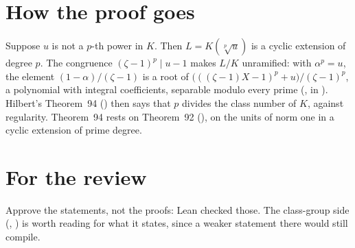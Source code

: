 \section{How the proof goes}

Suppose $u$ is not a $p$-th power in $K$. Then $L = K(\sqrt[p]{u})$ is a cyclic extension of
degree $p$. The congruence $(\zeta - 1)^p \mid u - 1$ makes $L/K$ unramified: with
$\alpha^p = u$, the element $(1 - \alpha)/(\zeta - 1)$ is a root of
$\bigl(((\zeta - 1)X - 1)^p + u\bigr)/(\zeta - 1)^p$, a polynomial with integral coefficients,
separable modulo every prime (, in ). Hilbert's
Theorem~94 () then says that $p$ divides the
class number of $K$, against regularity. Theorem~94 rests on Theorem~92 (), on the
units of norm one in a cyclic extension of prime degree.

\section{For the review}

Approve the statements, not the proofs: Lean checked those. The class-group side
(, ) is worth reading for
what it states, since a weaker statement there would still compile.

\fictional

